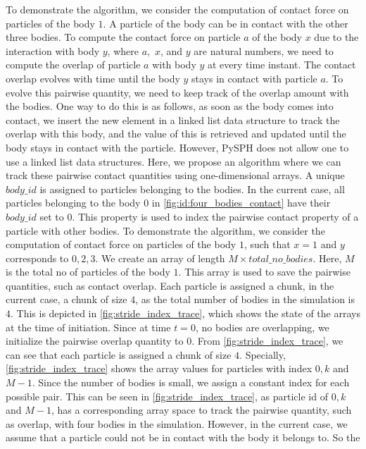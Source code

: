 To demonstrate the algorithm, we consider the computation of contact force on
particles of the body $1$. A particle of the body can be in contact with the
other three bodies. To compute the contact force on particle $a$ of the body $x$
due to the interaction with body $y$, where $a,$ $x$, and $y$ are natural
numbers, we need to compute the overlap of particle $a$ with body $y$ at every
time instant. The contact overlap evolves with time until the body $y$ stays in
contact with particle $a$. To evolve this pairwise quantity, we need to keep
track of the overlap amount with the bodies. One way to do this is as follows,
as soon as the body comes into contact, we insert the new element in a linked
list data structure to track the overlap with this body, and the value of this
is retrieved and updated until the body stays in contact with the particle.
However, PySPH does not allow one to use a linked list data structures. Here, we
propose an algorithm where we can track these pairwise contact quantities using
one-dimensional arrays. A unique $body\_id$ is assigned to particles belonging
to the bodies. In the current case, all particles belonging to the body $0$ in
\cref{fig:id:four_bodies_contact} have their $body\_id$ set to $0$. This
property is used to index the pairwise contact property of a particle with other
bodies. To demonstrate the algorithm, we consider the computation of contact
force on particles of the body $1$, such that $x=1$ and $y$ corresponds to
$0, 2, 3$. We create an array of length $M \times total\_no\_bodies$. Here, $M$
is the total no of particles of the body $1$. This array is used to save the
pairwise quantities, such as contact overlap. Each particle is assigned a chunk,
in the current case, a chunk of size $4$, as the total number of bodies in the
simulation is $4$. This is depicted in \cref{fig:stride_index_trace}, which
shows the state of the arrays at the time of initiation. Since at time $t=0$, no
bodies are overlapping, we initialize the pairwise overlap quantity to $0$. From
\cref{fig:stride_index_trace}, we can see that each particle is assigned a chunk
of size $4$. Specially, \cref{fig:stride_index_trace} shows the array values for
particles with index $0, k$ and $M-1$. Since the number of bodies is small, we
assign a constant index for each possible pair. This can be seen in
\cref{fig:stride_index_trace}, as particle id of $0, k$ and $M-1$, has a
corresponding array space to track the pairwise quantity, such as overlap, with
four bodies in the simulation. However, in the current case, we assume that a
particle could not be in contact with the body it belongs to. So the
